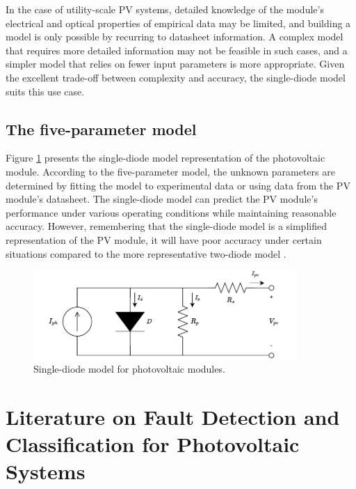 In the case of utility-scale PV systems, detailed knowledge of the module's electrical and optical properties of empirical data may be limited, and building a model is only possible by recurring to datasheet information. A complex model that requires more detailed information may not be feasible in such cases, and a simpler model that relies on fewer input parameters is more appropriate. Given the excellent trade-off between complexity and accuracy, the single-diode model suits this use case.

\subsection{The five-parameter model}

Figure \ref{fig:onediodedraw} presents the single-diode model representation of the photovoltaic module. According to the five-parameter model, the unknown parameters are determined by fitting the model to experimental data or using data from the PV module's datasheet. The single-diode model can predict the PV module's performance under various operating conditions while maintaining reasonable accuracy. However, remembering that the single-diode model is a simplified representation of the PV module, it will have poor accuracy under certain situations compared to the more representative two-diode model \cite{Godina2017}.

\begin{figure}[H]
    \centering
    \includegraphics[width=10cm]{figures/chapter2/onediode.drawio.pdf} \caption{Single-diode model for photovoltaic modules.}
    \label{fig:onediodedraw}
\end{figure}


\section{Literature on Fault Detection and Classification for Photovoltaic Systems}

